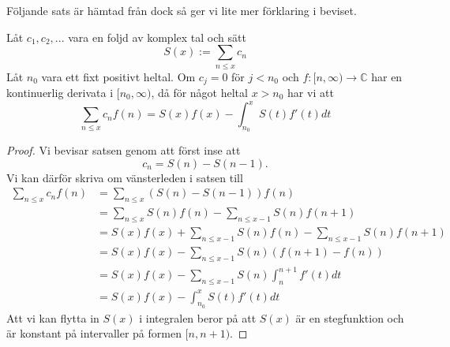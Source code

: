 Följande sats är hämtad från \cite[Sats 1.3.1]{cojocarumurty} dock så ger vi lite mer förklaring i beviset.
\begin{theorem}\label{APDX:parSum}
Låt \(c_1,c_2,...\) vara en foljd av komplex tal och sätt
\begin{equation}
    S(x) := \sum_{n\leq x}c_n\nonumber
\end{equation}
Låt \(n_0\) vara ett fixt positivt heltal. Om \(c_j = 0\) för \(j < n_0\) och \(f:[n, \infty) \longrightarrow\mathbb{C}\) har en kontinuerlig derivata i \([n_0, \infty)\), då för något heltal \(x > n_0\) har vi att
\begin{equation*}
    \sum_{n \leq x} c_n f(n) = S(x)f(x) - \int_{n_0}^xS(t)f'(t)dt
\end{equation*}
\end{theorem}
\begin{proof}
Vi bevisar satsen genom att först inse att
\begin{equation*}
    c_n = S(n) - S(n-1).
\end{equation*}
Vi kan därför skriva om vänsterleden i satsen till
\begin{align*}
    \sum_{n \leq x} c_n f(n) &= \sum_{n \leq x} (S(n) - S(n-1)) f(n)\\
    &= \sum_{n \leq x} S(n) f(n) - \sum_{n \leq x-1} S(n) f(n+1)\\
    &= S(x)f(x) + \sum_{n \leq x-1} S(n) f(n) - \sum_{n \leq x-1} S(n) f(n+1)\\
    &= S(x)f(x) - \sum_{n \leq x-1} S(n) (f(n+1)-f(n))\\
    &= S(x)f(x) - \sum_{n \leq x-1} S(n) \int_n^{n+1}f'(t)dt\\
    &= S(x)f(x) - \int_{n_0}^{x}S(t)f'(t)dt
\end{align*}
Att vi kan flytta in \(S(x)\) i integralen beror på att \(S(x)\) är en stegfunktion och är konstant på intervaller på formen \([n, n+1)\).
\end{proof}